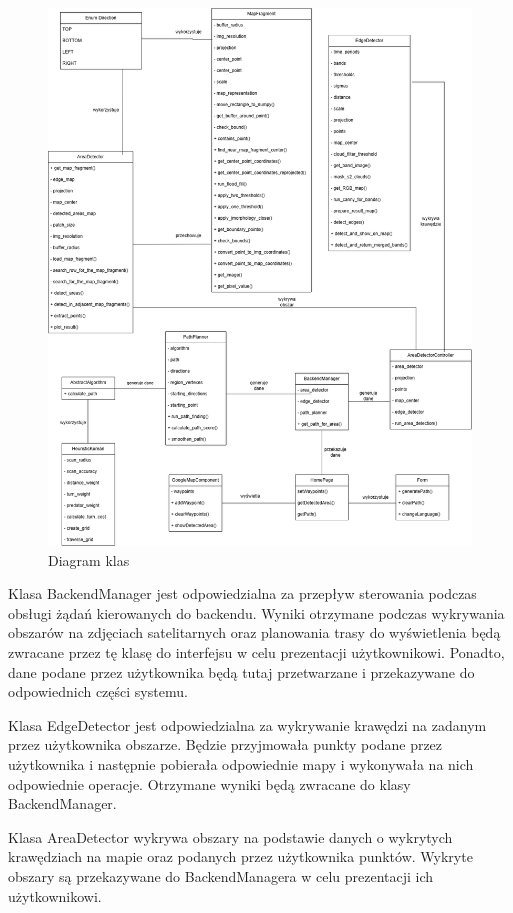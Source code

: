 \begin{figure}[H]
    \centering
    \includegraphics[width=15cm]{images/Diagram_klas.png}
    \caption{Diagram klas}
\end{figure}

Klasa BackendManager jest odpowiedzialna za przepływ sterowania podczas obsługi żądań kierowanych do backendu. Wyniki otrzymane podczas wykrywania obszarów na zdjęciach satelitarnych oraz planowania trasy do wyświetlenia będą zwracane przez tę klasę do interfejsu w celu prezentacji użytkownikowi. Ponadto, dane podane przez użytkownika będą tutaj przetwarzane i przekazywane do odpowiednich części systemu.

Klasa EdgeDetector jest odpowiedzialna za wykrywanie krawędzi na zadanym przez użytkownika obszarze. Będzie przyjmowała punkty podane przez użytkownika i następnie pobierała odpowiednie mapy i wykonywała na nich odpowiednie operacje. Otrzymane wyniki będą zwracane do klasy BackendManager.

Klasa AreaDetector wykrywa obszary na podstawie danych o wykrytych krawędziach na mapie oraz podanych przez użytkownika punktów. Wykryte obszary są przekazywane do BackendManagera w celu prezentacji ich użytkownikowi.

